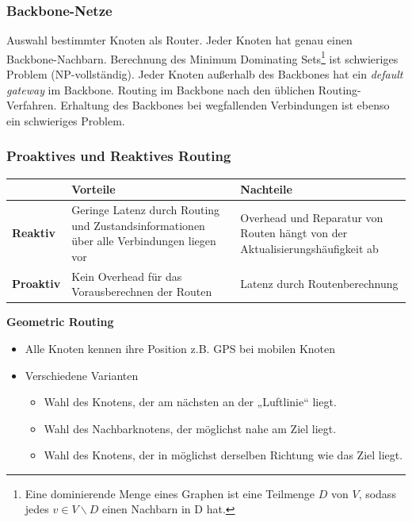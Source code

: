 \documentclass{article} %
\begin{document}
\subsubsection{Backbone-Netze}
Auswahl bestimmter Knoten als Router. Jeder Knoten hat
genau einen Backbone-Nachbarn.
Berechnung des Minimum Dominating Sets\footnote{Eine dominierende Menge eines Graphen ist eine Teilmenge $D$ von $V$, sodass jedes $v \in V \backslash D$ einen Nachbarn in D hat.} ist schwieriges Problem (NP-vollständig).
Jeder Knoten außerhalb des Backbones hat ein \emph{default gateway} im Backbone.
Routing im Backbone nach den üblichen Routing-Verfahren.
Erhaltung des Backbones bei wegfallenden Verbindungen ist ebenso ein schwieriges Problem.

\subsubsection{Proaktives und Reaktives Routing}
\begin{table}[h]
	\centering
	\label{tab:proaktiv-reaktiv}
	\begin{tabular}{|p{2cm}|p{6cm}|p{6cm}|}
		\hline
		& \textbf{Vorteile}                                                                        & \textbf{Nachteile}                                                           \\ \hline
		\textbf{Reaktiv}  & Geringe Latenz durch Routing und Zustandsinformationen über alle Verbindungen liegen vor & Overhead und Reparatur von Routen hängt von der Aktualisierungshäufigkeit ab \\ \hline
		\textbf{Proaktiv} & Kein Overhead für das Vorausberechnen der Routen                                         & Latenz durch Routenberechnung                                                \\ \hline
	\end{tabular}
\end{table}
\textbf{Geometric Routing}
\begin{itemize}
	\item Alle Knoten kennen ihre Position z.B. GPS bei mobilen Knoten
	\item Verschiedene Varianten
	\begin{itemize}
		\item 	Wahl des Knotens, der am nächsten an der „Luftlinie“ liegt.
		\item Wahl des Nachbarknotens, der möglichst nahe am Ziel liegt.
		\item Wahl des Knotens, der in möglichst derselben Richtung wie das Ziel liegt.
	\end{itemize}

\end{itemize}
\end{document}
